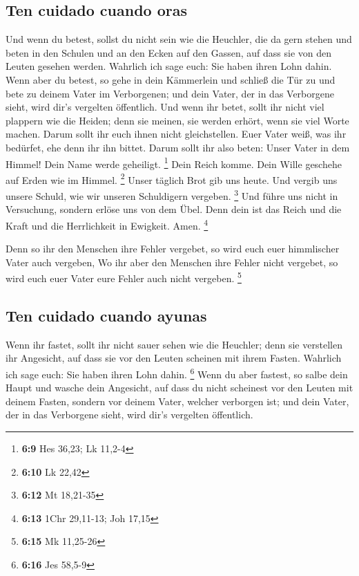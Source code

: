 \hypertarget{ten-cuidado-cuando-oras}{%
\subsection{Ten cuidado cuando oras}\label{ten-cuidado-cuando-oras}}

 Und wenn du betest, sollst du nicht sein wie die
Heuchler, die da gern stehen und beten in den Schulen und an den Ecken
auf den Gassen, auf dass sie von den Leuten gesehen werden. Wahrlich ich
sage euch: Sie haben ihren Lohn dahin.  Wenn aber du
betest, so gehe in dein Kämmerlein und schließ die Tür zu und bete zu
deinem Vater im Verborgenen; und dein Vater, der in das Verborgene
sieht, wird dir's vergelten öffentlich.  Und wenn ihr
betet, sollt ihr nicht viel plappern wie die Heiden; denn sie meinen,
sie werden erhört, wenn sie viel Worte machen.  Darum
sollt ihr euch ihnen nicht gleichstellen. Euer Vater weiß, was ihr
bedürfet, ehe denn ihr ihn bittet.  Darum sollt ihr also
beten: Unser Vater in dem Himmel! Dein Name werde geheiligt. \footnote{\textbf{6:9}
  Hes 36,23; Lk 11,2-4}  Dein Reich komme. Dein Wille
geschehe auf Erden wie im Himmel. \footnote{\textbf{6:10} Lk 22,42}
 Unser täglich Brot gib uns heute.  Und
vergib uns unsere Schuld, wie wir unseren Schuldigern vergeben.
\footnote{\textbf{6:12} Mt 18,21-35}  Und führe uns nicht
in Versuchung, sondern erlöse uns von dem Übel. Denn dein ist das Reich
und die Kraft und die Herrlichkeit in Ewigkeit. Amen. \footnote{\textbf{6:13}
  1Chr 29,11-13; Joh 17,15}

 Denn so ihr den Menschen ihre Fehler vergebet, so wird
euch euer himmlischer Vater auch vergeben,  Wo ihr aber
den Menschen ihre Fehler nicht vergebet, so wird euch euer Vater eure
Fehler auch nicht vergeben. \footnote{\textbf{6:15} Mk 11,25-26}

\hypertarget{ten-cuidado-cuando-ayunas}{%
\subsection{Ten cuidado cuando ayunas}\label{ten-cuidado-cuando-ayunas}}

 Wenn ihr fastet, sollt ihr nicht sauer sehen wie die
Heuchler; denn sie verstellen ihr Angesicht, auf dass sie vor den Leuten
scheinen mit ihrem Fasten. Wahrlich ich sage euch: Sie haben ihren Lohn
dahin. \footnote{\textbf{6:16} Jes 58,5-9}  Wenn du aber
fastest, so salbe dein Haupt und wasche dein Angesicht, 
auf dass du nicht scheinest vor den Leuten mit deinem Fasten, sondern
vor deinem Vater, welcher verborgen ist; und dein Vater, der in das
Verborgene sieht, wird dir's vergelten öffentlich.


